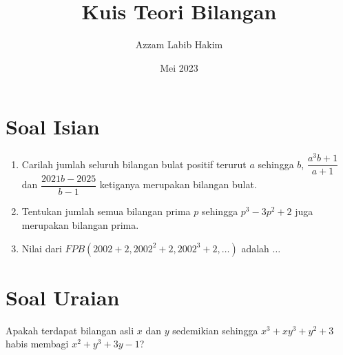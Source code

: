 \documentclass[a4paper,12pt,bahasa]{article}
\title{\textbf{Kuis Teori Bilangan}}
\author{Azzam Labib Hakim}
\date{Mei 2023}
\begin{document}
\maketitle

\section{Soal Isian}
\begin{enumerate}
    \item Carilah jumlah seluruh bilangan bulat positif terurut $a$ sehingga $b$, $\dfrac{a^3b+1}{a+1}$ dan $\dfrac{2021b-2025}{b-1}$ ketiganya merupakan bilangan bulat.


\item  Tentukan jumlah semua bilangan prima $p$ sehingga $p^3-3p^2+2$ juga merupakan bilangan prima.

\item Nilai dari $FPB(2002+2,2002^2+2,2002^3+2,\dots)$ adalah $\dots$
\end{enumerate}

\section{Soal Uraian}
Apakah terdapat bilangan asli $x$ dan $y$ sedemikian sehingga $x^3+xy^3+y^2+3$ habis membagi $x^2+y^3+3y-1$?
	
	
\end{document}
